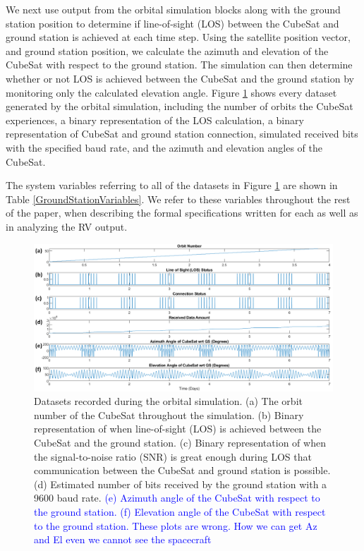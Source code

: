 \documentclass[conf]{new-aiaa}
\begin{document}
We next use output from the orbital simulation blocks along with the ground station position to determine if line-of-sight (LOS) between the CubeSat and ground station is achieved at each time step. Using the satellite position vector, and ground station position, we calculate the azimuth and elevation of the CubeSat with respect to the ground station. The simulation can then determine whether or not LOS is achieved between the CubeSat and the ground station by monitoring only the calculated elevation angle. Figure \ref{OrbitalDatasets} shows every dataset generated by the orbital simulation, including the number of orbits the CubeSat experiences, a binary representation of the LOS calculation, a binary representation of CubeSat and ground station connection, simulated received bits with the specified baud rate, and the azimuth and elevation angles of the CubeSat.

The system variables referring to all of the datasets in Figure \ref{OrbitalDatasets} are shown in Table \ref{GroundStationVariables}. We refer to these variables throughout the rest of the paper, when describing the formal specifications written for each as well as in analyzing the RV output.

\begin{figure}[!ht]
\centering
\includegraphics[width=1\textwidth]{Fig/OrbitSimData.Updated.png}
\caption{Datasets recorded during the orbital simulation. (a) The orbit number of the CubeSat throughout the simulation. (b) Binary representation of when line-of-sight (LOS) is achieved between the CubeSat and the ground station. (c) Binary representation of when the signal-to-noise ratio (SNR) is great enough during LOS that communication between the CubeSat and ground station is possible. (d) Estimated number of bits received by the ground station with a 9600 baud rate. \textcolor{blue}{(e) Azimuth angle of the CubeSat with respect to the ground station. (f) Elevation angle of the CubeSat with respect to the ground station. These plots are wrong. How we can get Az and El even we cannot see the spacecraft}}
\label{OrbitalDatasets}
\end{figure}
\end{document}
